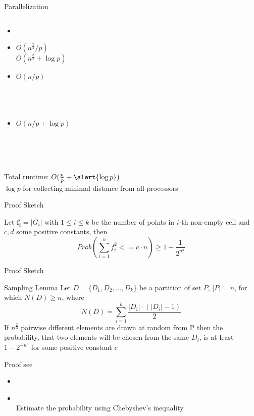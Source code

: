 \documentclass[18pt]{beamer}
\begin{document}
\begin{frame}{Parallelization}
\begin{columns}
		\begin{itemize}\itemsep0pt
			\item[]  
			\vspace{8pt}
			\item[]$O(n^{\frac{2}{3}}/p)$\\ $O(n^{\frac{8}{9}} + \log p)$ \\ 					
			\item[]$O(n/p)$\\\textcolor{white}{$|$} \\\textcolor{white}{$|$} \\ \textcolor{white}{$|$}\\  \textcolor{white}{$|$}\\
			\item[]$O(n/p + \log p)$\\\textcolor{white}{$|$} \\ \textcolor{white}{$|$} \\\textcolor{white}{$|$}\\
		\end{itemize}
\end{columns}
\vspace{2ex}
Total runtime: $O(\frac{n}{p} + \alert{\log p})$  \\
\hspace*{2em}$\log p$ for collecting minimal distance from all processors
\end{frame}

\begin{frame}{Proof Sketch}
	\begin{theorem}
		Let $\boldsymbol{f_i} = |G_i|$ with $1\leq i \leq k$ be the number of points in $i$-th non-empty cell and $c, d$ some positive constants, then 
	$$Prob\left(\sum_{i=1}^k f_i^2 <= c \cdot n \right) \geq  1 - \frac{1}{2^{n^d}}$$
	\end{theorem}
\end{frame}

\begin{frame}{Proof Sketch}
\begin{block}{Sampling Lemma}
Let $D = \{D_1, D_2,...,D_k\}$ be a partition of set $P$, $|P| = n$, for which $N(D) \geq n$, where
$$N(D) = \sum_{i=1}^k \frac{|D_i|\cdot (|D_i| - 1)}{2}$$ 
If $n^{\frac{2}{3}}$ pairwise different elements are drawn at random from P then the probability, that two elements will be chosen from the same $D_i$, is at least $1 - 2^{-n^c}$ for some positive constant $c$
\end{block}
Proof see
\begin{itemize}

\item \textbf{\cite{major}}
\item \textbf{\cite{dietzfelbinger1997reliable}} \\Estimate the probability using Chebyshev’s inequality
\end{itemize}

\end{frame}
\end{document}
